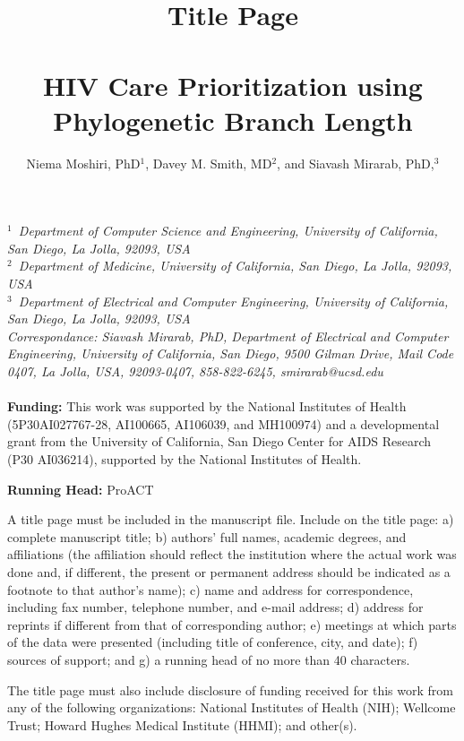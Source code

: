 \documentclass[a4paper,11pt]{article}
\newcommand{\TODO}[1]{{\color{red} #1} }
\begin{document}
\title{Title Page\\~\\HIV Care Prioritization using Phylogenetic Branch Length}

\author{Niema Moshiri, PhD$^{1}$, Davey M. Smith, MD$^{2}$, and
Siavash Mirarab, PhD,$^{3}$\\[4pt]}
\date{}

\maketitle

\textit{$^{1}$~Department of Computer Science and Engineering, University of California, San Diego, La Jolla, 92093, USA}
\\
\textit{$^{2}$~Department of Medicine, University of California, San Diego, La Jolla, 92093, USA}
\\
\textit{$^{3}$~Department of Electrical and Computer Engineering, University of California, San Diego, La Jolla, 92093, USA}
\\[2pt]

\textit{Correspondance: Siavash Mirarab, PhD, Department of Electrical and Computer Engineering, University of California, San Diego, 9500 Gilman Drive, Mail Code 0407, La Jolla, USA, 92093-0407, 858-822-6245, smirarab@ucsd.edu}\\~\\


{\bf Funding: }
This work was supported by the National Institutes of Health (5P30AI027767-28, AI100665, AI106039, and MH100974) and a developmental grant from the University of California, San Diego Center for AIDS Research (P30 AI036214), supported by the National Institutes of Health.

\textbf{Running Head:} ProACT

\TODO{A title page must be included in the manuscript file. Include on the title page: a) complete manuscript title; b) authors' full names, academic degrees, and affiliations (the affiliation should reflect the institution where the actual work was done and, if different, the present or permanent address should be indicated as a footnote to that author's name); c) name and address for correspondence, including fax number, telephone number, and e-mail address; d) address for reprints if different from that of corresponding author; e) meetings at which parts of the data were presented (including title of conference, city, and date); f) sources of support; and g) a running head of no more than 40 characters.

The title page must also include disclosure of funding received for this work from any of the following organizations: National Institutes of Health (NIH); Wellcome Trust; Howard Hughes Medical Institute (HHMI); and other(s).}
\end{document}
